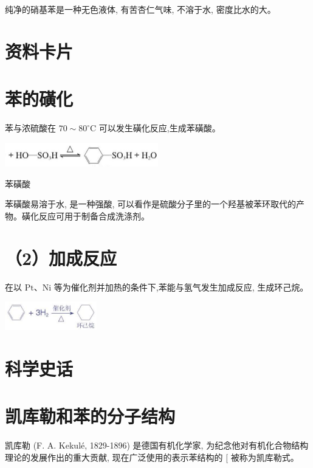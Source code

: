\documentclass[10pt]{article}
\begin{document}
纯净的硝基苯是一种无色液体, 有苦杏仁气味, 不溶于水, 密度比水的大。

\section*{资料卡片}

\section*{苯的磺化}

苯与浓硫酸在 \({70} \sim {80}^{ \circ }\mathrm{C}\) 可以发生磺化反应,生成苯磺酸。

\begin{center}
\includegraphics[max width=0.5\textwidth]{images/0190efc5-b58a-7c43-bfb0-e0a030df9cfd_50_859722.jpg}
\end{center}

苯磺酸

苯磺酸易溶于水, 是一种强酸, 可以看作是硫酸分子里的一个羟基被苯环取代的产物。磺化反应可用于制备合成洗涤剂。

\section*{（2）加成反应}

在以 \(\mathrm{{Pt}}\text{、}\mathrm{{Ni}}\) 等为催化剂并加热的条件下,苯能与氢气发生加成反应, 生成环己烷。

\begin{center}
\includegraphics[max width=0.3\textwidth]{images/0190efc5-b58a-7c43-bfb0-e0a030df9cfd_50_213419.jpg}
\end{center}

\section*{科学史话}

\section*{凯库勒和苯的分子结构}

凯库勒 (F. A. Kekulé, 1829-1896) 是德国有机化学家, 为纪念他对有机化合物结构理论的发展作出的重大贡献, 现在广泛使用的表示苯结构的 \(\lbrack\) 被称为凯库勒式。
\end{document}
